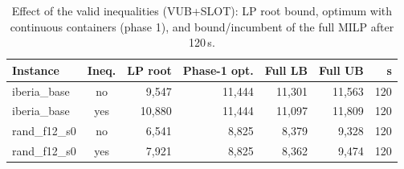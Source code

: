\begin{table}[t]\centering\small
\caption{Effect of the valid inequalities (VUB+SLOT): LP root bound, optimum with continuous containers (phase 1), and bound/incumbent of the full MILP after 120\,s.}\label{tab:ablation}
\begin{tabular}{lcrrrrr}\toprule
Instance & Ineq. & LP root & Phase-1 opt. & Full LB & Full UB & s\\\midrule
iberia\_base & no & 9,547 & 11,444 & 11,301 & 11,563 & 120\\
iberia\_base & yes & 10,880 & 11,444 & 11,097 & 11,809 & 120\\
rand\_f12\_s0 & no & 6,541 & 8,825 & 8,379 & 9,328 & 120\\
rand\_f12\_s0 & yes & 7,921 & 8,825 & 8,362 & 9,474 & 120\\
\bottomrule\end{tabular}\end{table}
